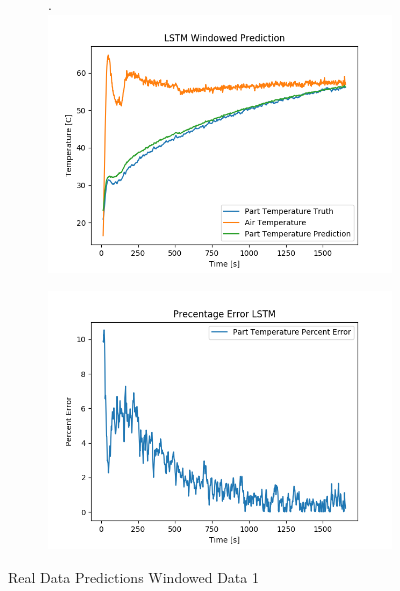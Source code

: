 \begin{figure}[ht]
    \begin{subfigure}{.5\linewidth}.
        \centering
    	\includegraphics[width=\linewidth]{lstm/lstm_w_predict_april1.png}
    \end{subfigure}
    \begin{subfigure}{.5\linewidth}
    	\centering
    	\includegraphics[width=\linewidth]{lstm/lstm_w_predict_april1_error.png}
    \end{subfigure}
    \caption{Real Data Predictions Windowed Data 1}
    \label{fig:real_data_window_lstm1}
\end{figure}
